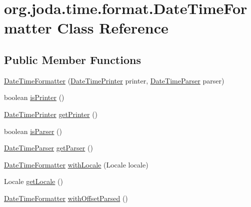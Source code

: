 \hypertarget{classorg_1_1joda_1_1time_1_1format_1_1_date_time_formatter}{\section{org.\-joda.\-time.\-format.\-Date\-Time\-Formatter Class Reference}
\label{classorg_1_1joda_1_1time_1_1format_1_1_date_time_formatter}
}
\subsection*{Public Member Functions}
\begin{DoxyCompactItemize}
\item 
\hyperlink{classorg_1_1joda_1_1time_1_1format_1_1_date_time_formatter_ac8a28f4e31f0b6973b3d6875a6192162}{Date\-Time\-Formatter} (\hyperlink{interfaceorg_1_1joda_1_1time_1_1format_1_1_date_time_printer}{Date\-Time\-Printer} printer, \hyperlink{interfaceorg_1_1joda_1_1time_1_1format_1_1_date_time_parser}{Date\-Time\-Parser} parser)
\item 
boolean \hyperlink{classorg_1_1joda_1_1time_1_1format_1_1_date_time_formatter_a0183475e5e212d4b05a96803d97e2960}{is\-Printer} ()
\item 
\hyperlink{interfaceorg_1_1joda_1_1time_1_1format_1_1_date_time_printer}{Date\-Time\-Printer} \hyperlink{classorg_1_1joda_1_1time_1_1format_1_1_date_time_formatter_a11c344aa08fd5f5043fa33567ab9c6af}{get\-Printer} ()
\item 
boolean \hyperlink{classorg_1_1joda_1_1time_1_1format_1_1_date_time_formatter_ac896f659a5b4a7e832005a424d25beb9}{is\-Parser} ()
\item 
\hyperlink{interfaceorg_1_1joda_1_1time_1_1format_1_1_date_time_parser}{Date\-Time\-Parser} \hyperlink{classorg_1_1joda_1_1time_1_1format_1_1_date_time_formatter_acc470e7e61294fcd6c9f23e5d51037f1}{get\-Parser} ()
\item 
\hyperlink{classorg_1_1joda_1_1time_1_1format_1_1_date_time_formatter}{Date\-Time\-Formatter} \hyperlink{classorg_1_1joda_1_1time_1_1format_1_1_date_time_formatter_a21ca0f007de491595b86838104b6df01}{with\-Locale} (Locale locale)
\item 
Locale \hyperlink{classorg_1_1joda_1_1time_1_1format_1_1_date_time_formatter_abc9434d0fc4b2ea9cd76be3fdc3e4780}{get\-Locale} ()
\item 
\hyperlink{classorg_1_1joda_1_1time_1_1format_1_1_date_time_formatter}{Date\-Time\-Formatter} \hyperlink{classorg_1_1joda_1_1time_1_1format_1_1_date_time_formatter_a0d5de6b63763b30a6c856bb38fd0f18d}{with\-Offset\-Parsed} ()

\end{DoxyCompactItemize}
